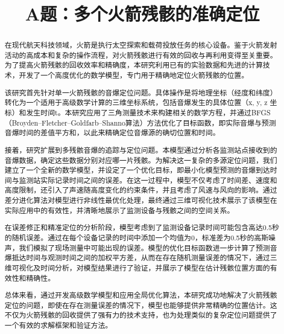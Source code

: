\documentclass[withoutpreface,bwprint,12pt,a4paper]{cumcmthesis}
\title{A题：多个火箭残骸的准确定位}
\begin{document}
\maketitle


 \begin{abstract}%
在现代航天科技领域，火箭是执行太空探索和载荷投放任务的核心设备。鉴于火箭发射活动的高成本和复杂的操作流程，对火箭残骸进行有效的回收与再利用变得至关重要。为了提高火箭残骸的回收效率和精确度，本研究利用已有的实验数据和先进的计算技术，开发了一个高度优化的数学模型，专门用于精确地定位火箭残骸的位置。

该研究首先针对单一火箭残骸的音爆定位问题。具体操作是将地理坐标（经度和纬度）转化为一个适用于高级数学计算的三维坐标系统，包括音爆发生的具体位置（x, y, z 坐标）和发生时间t。本研究应用了三角测量技术来构建相关的数学方程，并通过BFGS（Broyden–Fletcher–Goldfarb–Shanno算法）方法优化了目标函数，即实际音爆与预测音爆时间的差值平方和，以此来精确定位音爆源的确切位置和时间。

接着，研究扩展到多残骸音爆的追踪与定位问题。本模型通过分析各监测站点接收到的音爆数据，确定这些数据分别对应哪一片残骸。为解决这一复杂的多源定位问题，我们建立了一个全新的数学模型，并设定了一个优化目标，即最小化模型预测的音爆到达时间与监测站实际记录时间之间的误差。在这一过程中，模型不仅考虑了时间差、速度和高度限制，还引入了声速随高度变化的约束条件，并且考虑了风速与风向的影响。通过差分进化算法对模型进行非线性最优化处理，最终通过三维可视化技术展示了该模型在实际应用中的有效性，并清晰地展示了监测设备与残骸之间的空间关系。

在误差修正和精准定位的分析阶段，模型考虑到了监测设备记录时间可能包含高达0.5秒的随机误差。通过在每个设备记录的时间中添加一个均值为0，标准差为0.5秒的高斯噪声，我们模拟了现场测量中可能出现的误差。模型的优化目标函数进一步计算了预测音爆抵达时间与观测时间之间的加权平方差，从而在存在随机测量误差的情况下，通过三维可视化及时间分析，对模型结果进行了验证，并展示了模型在估计残骸位置方面的有效性和精确性。

总体来看，通过开发高级数学模型和应用全局优化算法，本研究成功地解决了火箭残骸定位的问题，即使在存在测量误差的情况下，模型也能够提供非常精确的位置估计。这不仅为火箭残骸的回收提供了强有力的技术支持，也为处理类似的复杂定位问题提供了一个有效的求解框架和验证方法。

\end{abstract}

\end{document}
